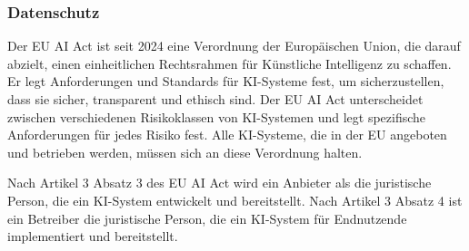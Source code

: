 \subsubsection{Datenschutz} \label{sec:llm_datenschutz}

Der EU AI Act ist seit 2024 eine Verordnung der Europäischen Union, die darauf abzielt, einen einheitlichen Rechtsrahmen für Künstliche Intelligenz zu schaffen. Er legt Anforderungen und Standards für KI-Systeme fest, um sicherzustellen, dass sie sicher, transparent und ethisch sind. Der EU AI Act unterscheidet zwischen verschiedenen Risikoklassen von KI-Systemen und legt spezifische Anforderungen für jedes Risiko fest. Alle KI-Systeme, die in der EU angeboten und betrieben werden, müssen sich an diese Verordnung halten. \cite{llm-privacy}

Nach Artikel 3 Absatz 3 des EU AI Act wird ein Anbieter als die juristische Person, die ein KI-System entwickelt und bereitstellt. Nach Artikel 3 Absatz 4 ist ein Betreiber die juristische Person, die ein KI-System für Endnutzende implementiert und bereitstellt. \cite{ai-act-3}   

